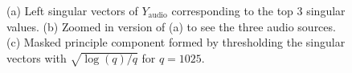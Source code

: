 \begin{figure}
  \begin{center}
    \caption{(a) Left singular vectors of $Y_{\text{audio}}$ corresponding to the top 3
      singular values. (b) Zoomed in version of (a) to see the three audio sources. (c)
      Masked principle component formed by thresholding the singular vectors with
      $\sqrt{\log(q)/q}$ for $q=1025$.}
    \label{fig:chpt4:av_audio_pca}
  \end{center}
\end{figure}


